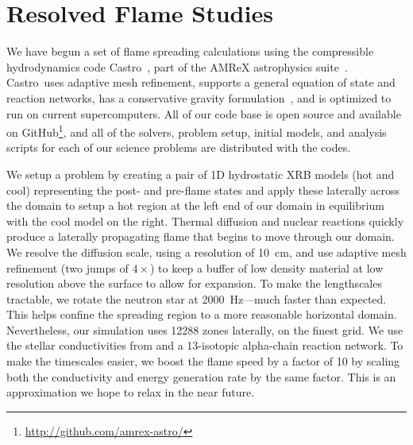 \documentclass[a4paper]{jpconf}
\newcommand{\castro}{{\sffamily Castro}}
\begin{document}
\section{Resolved Flame Studies}

We have begun a set of flame spreading calculations using the
compressible hydrodynamics code \castro~\cite{castro}, part of the
AMReX astrophysics suite~\cite{astronum:2017}.  \castro\ uses adaptive
mesh refinement, supports a general equation of state and reaction
networks, has a conservative gravity formulation~\cite{wdmergerI}, and
is optimized to run on current supercomputers.  All of our code base
is open source and available on
GitHub\footnote{\url{http://github.com/amrex-astro/}}, and all of the
solvers, problem setup, initial models, and analysis scripts for each
of our science problems are distributed with the codes.

We setup a problem by creating a pair of 1D hydrostatic XRB models (hot and cool)
representing the post- and pre-flame states and apply these laterally
across the domain to setup a hot region at the left end of our domain
in equilibrium with the cool model on the right.  Thermal diffusion and nuclear
reactions quickly produce a laterally propagating flame that begins to
move through our domain.  We resolve the diffusion scale, using a
resolution of 10~cm, and use adaptive mesh refinement (two jumps of
$4\times$) to keep a buffer of low density material at low resolution
above the surface to allow for expansion.  To make the lengthscales
tractable, we rotate the neutron star at 2000~Hz---much faster than
expected.  This helps confine the spreading region to a more
reasonable horizontal domain.  Nevertheless, our simulation uses 12288
zones laterally, on the finest grid.  We use the stellar
conductivities from \cite{Timmes00} and a 13-isotopic alpha-chain
reaction network.  To make the timescales easier, we boost the flame
speed by a factor of 10 by scaling both the conductivity and energy
generation rate by the same factor.  This is an approximation we hope to
relax in the near future.
\end{document}
